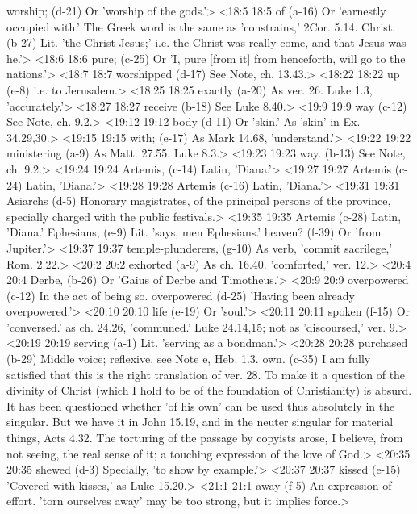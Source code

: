   worship; (d-21)  Or 'worship of the gods.'>
<18:5 18:5  of (a-16)  Or 'earnestly occupied with.' The Greek word is the same as  'constrains,' 2Cor. 5.14.
  Christ. (b-27)  Lit. 'the Christ Jesus;' i.e. the Christ was really come, and  that Jesus was he.'>
<18:6 18:6  pure; (c-25)  Or 'I, pure [from it] from henceforth, will go to the  nations.'>
<18:7 18:7  worshipped (d-17)  See Note, ch. 13.43.>
<18:22 18:22  up (e-8)  i.e. to Jerusalem.>
<18:25 18:25  exactly (a-20)  As ver. 26. Luke 1.3, 'accurately.'>
<18:27 18:27  receive (b-18)  See Luke 8.40.>
<19:9 19:9  way (c-12)  See Note, ch. 9.2.>
<19:12 19:12  body (d-11)  Or 'skin.' As 'skin' in Ex. 34.29,30.>
<19:15 19:15  with; (e-17)  As Mark 14.68, 'understand.'>
<19:22 19:22  ministering (a-9)  As Matt. 27.55. Luke 8.3.>
<19:23 19:23  way. (b-13)  See Note, ch. 9.2.>
<19:24 19:24  Artemis, (c-14) Latin, 'Diana.'>
<19:27 19:27  Artemis (c-24) Latin, 'Diana.'>
<19:28 19:28  Artemis (c-16) Latin, 'Diana.'>
<19:31 19:31  Asiarchs (d-5)  Honorary magistrates, of the principal persons of the  province, specially charged with the public festivals.>
<19:35 19:35  Artemis (c-28)  Latin, 'Diana.'
  Ephesians, (e-9)  Lit. 'says, men Ephesians.'
  heaven? (f-39)  Or 'from Jupiter.'>
<19:37 19:37  temple-plunderers, (g-10)  As verb, 'commit sacrilege,' Rom. 2.22.>
<20:2 20:2  exhorted (a-9)  As ch. 16.40. 'comforted,' ver. 12.>
<20:4 20:4  Derbe, (b-26)  Or 'Gaius of Derbe and Timotheus.'>
<20:9 20:9  overpowered (c-12)  In the act of being so.
  overpowered (d-25)  'Having been already overpowered.'>
<20:10 20:10  life (e-19)  Or 'soul.'>
<20:11 20:11  spoken (f-15)  Or 'conversed.' as ch. 24.26, 'communed.' Luke 24.14,15; not  as 'discoursed,' ver. 9.>
<20:19 20:19  serving (a-1)  Lit. 'serving as a bondman.'>
<20:28 20:28  purchased (b-29)  Middle voice; reflexive. see Note e, Heb. 1.3.
  own. (c-35)  I am fully satisfied that this is the right translation of  ver. 28. To make it a question of the divinity of Christ (which  I hold to be of the foundation of Christianity) is absurd. It  has been questioned whether 'of his own' can be used thus  absolutely in the singular. But we have it in John 15.19, and  in the neuter singular for material things, Acts 4.32. The  torturing of the passage by copyists arose, I believe, from not  seeing, the real sense of it; a touching expression of the love  of God.>
<20:35 20:35  shewed (d-3)  Specially, 'to show by example.'>
<20:37 20:37  kissed (e-15)  'Covered with kisses,' as Luke 15.20.>
<21:1 21:1  away (f-5)  An expression of effort. 'torn ourselves away' may be too  strong, but it implies force.>
